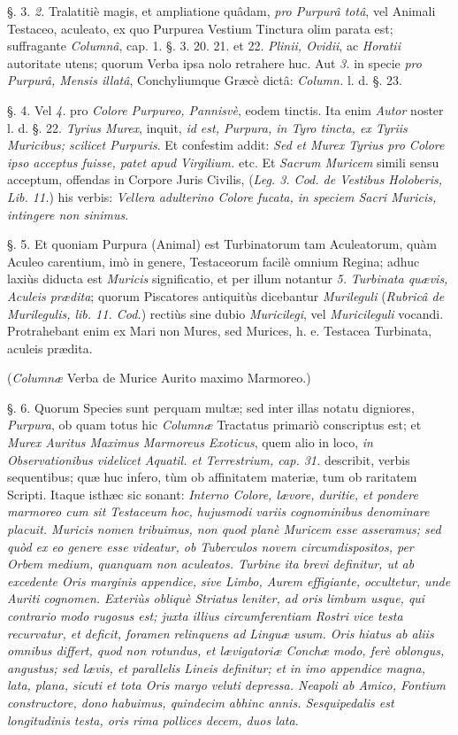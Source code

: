 \documentclass[a4paper, 11pt, oneside, polutonikogreek, german]{article}
\begin{document}
§. 3. \emph{2.} Tralatitiè magis, et ampliatione quâdam, \emph{pro Purpurâ totâ}, vel Animali Testaceo, aculeato, ex quo Purpurea Vestium Tinctura olim parata est; suffragante \emph{Columnâ}, cap. 1. §. 3. 20. 21. et 22. \emph{Plinii, Ovidii}, ac \emph{Horatii} autoritate utens; quorum Verba ipsa nolo retrahere huc. Aut \emph{3.} in specie \emph{pro Purpurâ, Mensis illatâ}, Conchyliumque Græcè dictâ: \emph{Column.} l. d. §. 23.

§. 4. Vel \emph{4.} pro \emph{Colore Purpureo, Pannisvè}, eodem tinctis. Ita enim \emph{Autor} noster l. d. §. 22. \emph{Tyrius Murex}, inquit, \emph{id est, Purpura, in Tyro tincta, ex Tyriis Muricibus; scilicet Purpuris}. Et confestim addit: \emph{Sed et Murex Tyrius pro Colore ipso acceptus fuisse, patet apud Virgilium.} etc. Et \emph{Sacrum Muricem} simili sensu acceptum, offendas in Corpore Juris Civilis, (\emph{Leg. 3. Cod. de Vestibus Holoberis, Lib. 11.}) his verbis: \emph{Vellera adulterino Colore fucata, in speciem Sacri Muricis, intingere non sinimus}.

§. 5. Et quoniam Purpura (Animal) est Turbinatorum tam Aculeatorum, quàm Aculeo carentium, imò in genere, Testaceorum facilè omnium Regina; adhuc laxiùs diducta est \emph{Muricis} significatio, et per illum notantur \emph{5.} \emph{Turbinata quævis, Aculeis prædita}; quorum Piscatores antiquitùs dicebantur \emph{Murileguli} (\emph{Rubricâ de Murilegulis, lib. 11. Cod.}) rectiùs sine dubio \emph{Muricilegi}, vel \emph{Muricileguli} vocandi. Protrahebant enim ex Mari non Mures, sed Murices, h. e. Testacea Turbinata, aculeis prædita.

(\emph{Columnæ} Verba de Murice Aurito maximo Marmoreo.)

§. 6. Quorum Species sunt perquam multæ; sed inter illas notatu digniores, \emph{Purpura}, ob quam totus hic \emph{Columnæ} Tractatus primariò conscriptus est; et \emph{Murex Auritus Maximus Marmoreus Exoticus}, quem alio in loco, \emph{in Observationibus videlicet Aquatil. et Terrestrium, cap. 31.} describit, verbis sequentibus; quæ huc infero, tùm ob affinitatem materiæ, tum ob raritatem Scripti. Itaque isthæc sic sonant: \emph{Interno Colore, lævore, duritie, et pondere marmoreo cum sit Testaceum hoc, hujusmodi variis cognominibus denominare placuit. Muricis nomen tribuimus, non quod planè Muricem esse asseramus; sed quòd ex eo genere esse videatur, ob Tuberculos novem circumdispositos, per Orbem medium, quanquam non aculeatos. Turbine ita brevi definitur, ut ab excedente Oris marginis appendice, sive Limbo, Aurem effigiante, occultetur, unde Auriti cognomen. Exteriùs obliquè Striatus leniter, ad oris limbum usque, qui contrario modo rugosus est; juxta illius circumferentiam Rostri vice testa recurvatur, et deficit, foramen relinquens ad Linguæ usum. Oris hiatus ab aliis omnibus differt, quod non rotundus, et lævigatoriæ Conchæ modo, ferè oblongus, angustus; sed lævis, et parallelis Lineis definitur; et in imo appendice magna, lata, plana, sicuti et tota Oris margo veluti depressa. Neapoli ab Amico, Fontium constructore, dono habuimus, quindecim abhinc annis. Sesquipedalis est longitudinis testa, oris rima pollices decem, duos lata}.
\end{document}
